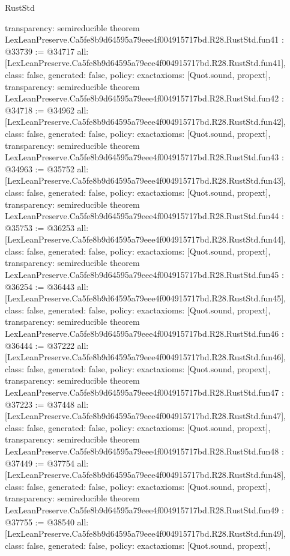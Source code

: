 \begin{lexlean}{RustStd}
\begin{coremodule}
{  transparency: semireducible
}
theorem LexLeanPreserve.Ca5fe8b9d64595a79eee4f004915717bd.R28.RustStd.fun41 : @33739 := @34717 {
  all: [LexLeanPreserve.Ca5fe8b9d64595a79eee4f004915717bd.R28.RustStd.fun41],
  class: false,
  generated: false,
  policy: exact{axioms: [Quot.sound, propext]},
  transparency: semireducible
}
theorem LexLeanPreserve.Ca5fe8b9d64595a79eee4f004915717bd.R28.RustStd.fun42 : @34718 := @34962 {
  all: [LexLeanPreserve.Ca5fe8b9d64595a79eee4f004915717bd.R28.RustStd.fun42],
  class: false,
  generated: false,
  policy: exact{axioms: [Quot.sound, propext]},
  transparency: semireducible
}
theorem LexLeanPreserve.Ca5fe8b9d64595a79eee4f004915717bd.R28.RustStd.fun43 : @34963 := @35752 {
  all: [LexLeanPreserve.Ca5fe8b9d64595a79eee4f004915717bd.R28.RustStd.fun43],
  class: false,
  generated: false,
  policy: exact{axioms: [Quot.sound, propext]},
  transparency: semireducible
}
theorem LexLeanPreserve.Ca5fe8b9d64595a79eee4f004915717bd.R28.RustStd.fun44 : @35753 := @36253 {
  all: [LexLeanPreserve.Ca5fe8b9d64595a79eee4f004915717bd.R28.RustStd.fun44],
  class: false,
  generated: false,
  policy: exact{axioms: [Quot.sound, propext]},
  transparency: semireducible
}
theorem LexLeanPreserve.Ca5fe8b9d64595a79eee4f004915717bd.R28.RustStd.fun45 : @36254 := @36443 {
  all: [LexLeanPreserve.Ca5fe8b9d64595a79eee4f004915717bd.R28.RustStd.fun45],
  class: false,
  generated: false,
  policy: exact{axioms: [Quot.sound, propext]},
  transparency: semireducible
}
theorem LexLeanPreserve.Ca5fe8b9d64595a79eee4f004915717bd.R28.RustStd.fun46 : @36444 := @37222 {
  all: [LexLeanPreserve.Ca5fe8b9d64595a79eee4f004915717bd.R28.RustStd.fun46],
  class: false,
  generated: false,
  policy: exact{axioms: [Quot.sound, propext]},
  transparency: semireducible
}
theorem LexLeanPreserve.Ca5fe8b9d64595a79eee4f004915717bd.R28.RustStd.fun47 : @37223 := @37448 {
  all: [LexLeanPreserve.Ca5fe8b9d64595a79eee4f004915717bd.R28.RustStd.fun47],
  class: false,
  generated: false,
  policy: exact{axioms: [Quot.sound, propext]},
  transparency: semireducible
}
theorem LexLeanPreserve.Ca5fe8b9d64595a79eee4f004915717bd.R28.RustStd.fun48 : @37449 := @37754 {
  all: [LexLeanPreserve.Ca5fe8b9d64595a79eee4f004915717bd.R28.RustStd.fun48],
  class: false,
  generated: false,
  policy: exact{axioms: [Quot.sound, propext]},
  transparency: semireducible
}
theorem LexLeanPreserve.Ca5fe8b9d64595a79eee4f004915717bd.R28.RustStd.fun49 : @37755 := @38540 {
  all: [LexLeanPreserve.Ca5fe8b9d64595a79eee4f004915717bd.R28.RustStd.fun49],
  class: false,
  generated: false,
  policy: exact{axioms: [Quot.sound, propext]},
}
\end{coremodule}
\end{lexlean}
